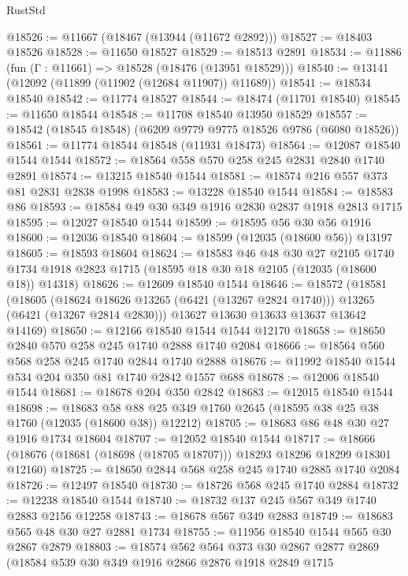 \begin{lexlean}{RustStd}
\begin{coremodule}
@18526 := @11667 (@18467 (@13944 (@11672 @2892)))
@18527 := @18403 @18526
@18528 := @11650 @18527
@18529 := @18513 @2891
@18534 := @11886 (fun (Γ : @11661) => @18528 (@18476 (@13951 @18529)))
@18540 := @13141 (@12092 (@11899 (@11902 (@12684 @11907)) @11689))
@18541 := @18534 @18540
@18542 := @11774 @18527
@18544 := @18474 (@11701 @18540)
@18545 := @11650 @18544
@18548 := @11708 @18540 @13950 @18529
@18557 := @18542 (@18545 @18548) (@6209 @9779 @9775 @18526 @9786 (@6080 @18526))
@18561 := @11774 @18544 @18548 (@11931 @18473)
@18564 := @12087 @18540 @1544 @1544
@18572 := @18564 @558 @570 @258 @245 @2831 @2840 @1740 @2891
@18574 := @13215 @18540 @1544
@18581 := @18574 @216 @557 @373 @81 @2831 @2838 @1998
@18583 := @13228 @18540 @1544
@18584 := @18583 @86
@18593 := @18584 @49 @30 @349 @1916 @2830 @2837 @1918 @2813 @1715
@18595 := @12027 @18540 @1544
@18599 := @18595 @56 @30 @56 @1916
@18600 := @12036 @18540
@18604 := @18599 (@12035 (@18600 @56)) @13197
@18605 := @18593 @18604
@18624 := @18583
    @46
    @48
    @30
    @27
    @2105
    @1740
    @1734
    @1918
    @2823
    @1715
    (@18595 @18 @30 @18 @2105 (@12035 (@18600 @18)) @14318)
@18626 := @12609 @18540 @1544
@18646 := @18572
    (@18581
      (@18605
        (@18624 @18626 @13265 (@6421 (@13267 @2824 @1740)))
        @13265
        (@6421 (@13267 @2814 @2830)))
      @13627
      @13630
      @13633
      @13637
      @13642
      @14169)
@18650 := @12166 @18540 @1544 @1544 @12170
@18658 := @18650 @2840 @570 @258 @245 @1740 @2888 @1740 @2084
@18666 := @18564 @560 @568 @258 @245 @1740 @2844 @1740 @2888
@18676 := @11992 @18540 @1544 @534 @204 @350 @81 @1740 @2842 @1557 @688
@18678 := @12006 @18540 @1544
@18681 := @18678 @204 @350 @2842
@18683 := @12015 @18540 @1544
@18698 := @18683
    @58
    @88
    @25
    @349
    @1760
    @2645
    (@18595 @38 @25 @38 @1760 (@12035 (@18600 @38)) @12212)
@18705 := @18683 @86 @48 @30 @27 @1916 @1734 @18604
@18707 := @12052 @18540 @1544
@18717 := @18666 (@18676 (@18681 (@18698 (@18705 @18707))) @18293 @18296 @18299 @18301 @12160)
@18725 := @18650 @2844 @568 @258 @245 @1740 @2885 @1740 @2084
@18726 := @12497 @18540
@18730 := @18726 @568 @245 @1740 @2884
@18732 := @12238 @18540 @1544
@18740 := @18732 @137 @245 @567 @349 @1740 @2883 @2156 @12258
@18743 := @18678 @567 @349 @2883
@18749 := @18683 @565 @48 @30 @27 @2881 @1734
@18755 := @11956 @18540 @1544 @565 @30 @2867 @2879
@18803 := @18574
    @562
    @564
    @373
    @30
    @2867
    @2877
    @2869
    (@18584
      @539
      @30
      @349
      @1916
      @2866
      @2876
      @1918
      @2849
      @1715

\end{coremodule}
\end{lexlean}
